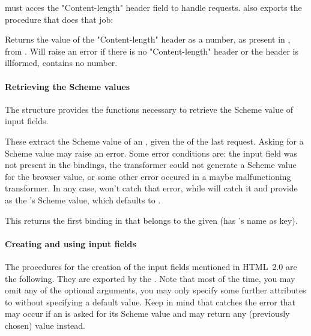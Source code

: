  must acces the "Content-length" header field to
  handle  requests.   also exports the
  procedure that does that job:

\begin{desc}
  Returns the value of the "Content-length" header as a number, as
  present in , \eg from .
  Will raise an error if there is no "Content-length" header or the
  header is illformed, \eg contains no number.
\end{desc}

\paragraph{Retrieving the Scheme values}

The  structure provides the functions
  necessary to retrieve the Scheme value of input fields.

\begin{desc}
  These extract the Scheme value of an , given the
   of the last request.  Asking for a Scheme value may
  raise an error.  Some error conditions are: the input field was not
  present in the bindings, the transformer could not generate a Scheme
  value for the browser value, or some other error occured in a maybe
  malfunctioning transformer.  In any case, 
  won't catch that error, while  will catch it
  and provide  as the 's Scheme
  value, which defaults to \sharpf.
\end{desc}

\begin{desc}
  This returns the first binding in  that belongs to the
  given  (\ie has 's name as key).
\end{desc}

\paragraph{Creating and using input fields}

The procedures for the creation of the input fields mentioned in
  HTML~2.0 are the following.  They are exported by the
  .  Note that most of the time,
  you may omit any of the optional arguments, \eg you may only specify
  some further attributes to  without specifying a
  default value.  Keep in mind that  catches the
  error that may occur if an  is asked for its Scheme
  value and may return any (previously chosen) value instead.

